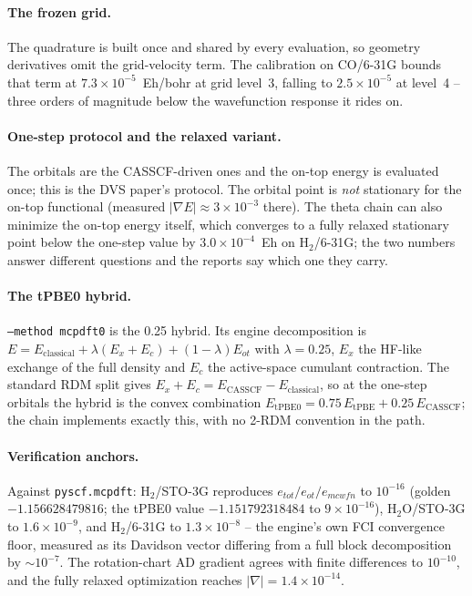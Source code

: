 \paragraph{The frozen grid.}
The quadrature is built once and shared by every evaluation, so
geometry derivatives omit the grid-velocity term.  The calibration on
CO/6-31G bounds that term at $7.3\times10^{-5}$~Eh/bohr at grid
level~3, falling to $2.5\times10^{-5}$ at level~4 -- three orders of
magnitude below the wavefunction response it rides on.

\paragraph{One-step protocol and the relaxed variant.}
The orbitals are the CASSCF-driven ones and the on-top energy is
evaluated once; this is the DVS paper's protocol.  The orbital point
is \emph{not} stationary for the on-top functional (measured
$|\nabla E| \approx 3\times10^{-3}$ there).  The theta chain can also
minimize the on-top energy itself, which converges to a fully relaxed
stationary point below the one-step value by
$3.0\times10^{-4}$~Eh on H$_2$/6-31G; the two numbers answer different
questions and the reports say which one they carry.

\paragraph{The tPBE0 hybrid.}
\texttt{--method mcpdft0} is the 0.25 hybrid.  Its engine
decomposition is $E = E_{\mathrm{classical}} + \lambda (E_x + E_c)
+ (1-\lambda) E_{ot}$ with $\lambda = 0.25$, $E_x$ the HF-like
exchange of the full density and $E_c$ the active-space cumulant
contraction.  The standard RDM split gives $E_x + E_c =
E_{\mathrm{CASSCF}} - E_{\mathrm{classical}}$, so at the one-step
orbitals the hybrid is the convex combination
$E_{\mathrm{tPBE0}} = 0.75\,E_{\mathrm{tPBE}} + 0.25\,E_{\mathrm{CASSCF}}$;
the chain implements exactly this, with no 2-RDM convention in the
path.

\paragraph{Verification anchors.}
Against \texttt{pyscf.mcpdft}: H$_2$/STO-3G reproduces
$e_{tot}/e_{ot}/e_{mcwfn}$ to $10^{-16}$ (golden
$-1.156628479816$; the tPBE0 value $-1.151792318484$ to
$9\times10^{-16}$), H$_2$O/STO-3G to $1.6\times10^{-9}$, and
H$_2$/6-31G to $1.3\times10^{-8}$ -- the engine's own FCI convergence
floor, measured as its Davidson vector differing from a full block
decomposition by $\sim10^{-7}$.  The rotation-chart AD gradient agrees
with finite differences to $10^{-10}$, and the fully relaxed
optimization reaches $|\nabla| = 1.4\times10^{-14}$.

